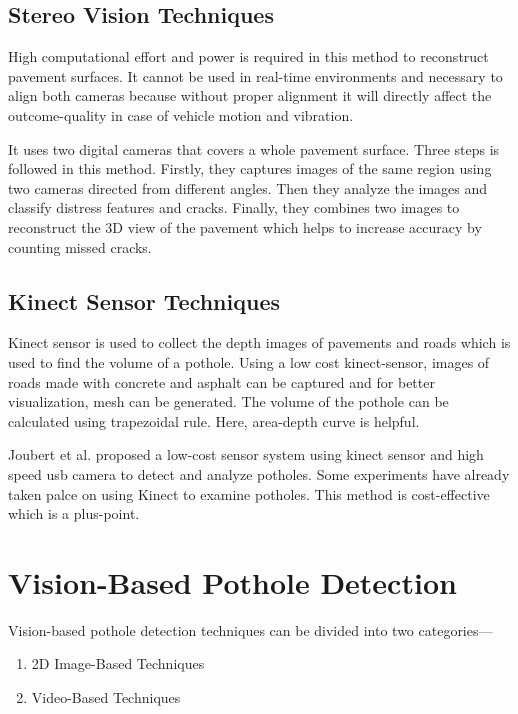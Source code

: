     \subsection{Stereo Vision Techniques}
        High computational effort and power is required in this method to reconstruct pavement surfaces\cite{Salari2012PavementDE}. It cannot be used in real-time environments and necessary to align both cameras because without proper alignment it will directly affect the outcome-quality in case of vehicle motion and vibration.
        
        It uses two digital cameras\cite{wang04} that covers a whole pavement surface. Three steps is followed in this method. Firstly, they captures images of the same region using two cameras directed from different angles. Then they analyze the images and classify distress features and cracks. Finally, they combines two images to reconstruct the 3D view of the pavement which helps to increase accuracy by counting missed cracks.
        
    \subsection{Kinect Sensor Techniques}
        Kinect sensor is used to collect the depth images of pavements and roads which is used to find the volume of a pothole\cite{akagic17}. Using a low cost kinect-sensor, images of roads made with concrete and asphalt can be captured and for better visualization, mesh can be generated. The volume of the pothole can be calculated using trapezoidal rule. Here, area-depth curve is helpful.
        
        \vspace{8mm}
        Joubert et al.\cite{buza2013stereo} proposed a low-cost sensor system using kinect sensor and high speed \acrshort{usb} camera\cite{buza2013stereo} to detect and analyze potholes. Some experiments have already taken palce on using Kinect to examine potholes. This method is cost-effective which is a plus-point.
        
\section{Vision-Based Pothole Detection}
    Vision-based pothole detection techniques can be divided into two categories---
    \begin{enumerate}
        \item {2D Image-Based Techniques}
        \item{Video-Based Techniques}
    \end{enumerate}
    
